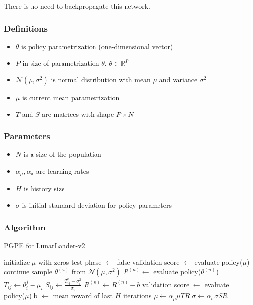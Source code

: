 \documentclass[12pt]{article}
\begin{document}
There is no need to backpropagate this network.

\subsubsection{Definitions}

\begin{itemize}

\item $\theta$ is policy parametrization (one-dimensional vector)

\item $P$ in size of parametrization $\theta$. $\theta \in \mathbb{R}^P$

\item $\mathcal{N}(\mu, \sigma^2)$ is normal distribution with mean $\mu$ and variance $\sigma^2$

\item $\mu$ is current mean parametrization

\item $T$ and $S$ are matrices with shape $P\times N$

\end{itemize}

\subsubsection{Parameters}

\begin{itemize}
\item $N$ is a size of the population
\item $\alpha_\mu, \alpha_\sigma$ are learning rates
\item $H$ is history size
\item $\sigma$ is initial standard deviation for policy parameters

\end{itemize}

\subsubsection{Algorithm}

\begin{algorithm}
\caption{PGPE for LunarLander-v2}
\begin{algorithmic}[1]
\State initialize $\mu$ with zeros
\State test phase $\gets$ false
		\State validation score $\gets$ evaluate policy($\mu$)
		\State continue
	\EndIf
		\State sample $\theta^{(n)}$ from $\mathcal{N}(\mu, \sigma^2)$
	\State $R^{(n)} \gets$ evaluate policy($\theta^{(n)}$)
	\EndFor
	\State $T_{ij} \gets \theta_i^{j} - \mu_i$
	\State $S_{ij} \gets \frac{T_{ij}^2 - \sigma_i^2}{\sigma_i}$
	\State $R^{(n)} \gets R^{(n)} - b$
	\State validation score $\gets$ evaluate policy($\mu$)
	\State b $\gets$ mean reward of last $H$ iterations
	\EndIf
	\State $\mu \gets \alpha_\mu \mu TR$
	\State $\sigma \gets \alpha_\sigma \sigma SR$
\EndWhile

\end{algorithmic}
\end{algorithm}
\end{document}
